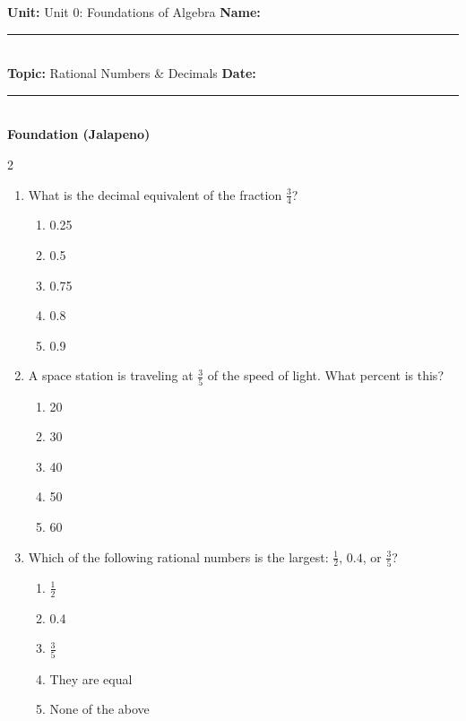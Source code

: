 \documentclass[10pt]{article}
\begin{document}
\enlargethispage{2.5cm}

\begin{tcolorbox}[colback=mainblue!5, colframe=mainblue, sharp corners, boxrule=0.5pt]
    \small \textbf{Unit:} Unit 0: Foundations of Algebra \hfill \textbf{Name:} \rule{3cm}{0.4pt} \\
    \small \textbf{Topic:} Rational Numbers & Decimals \hfill \textbf{Date:} \rule{2cm}{0.4pt} \\
    \centering \textbf{\large Foundation (Jalapeno)}
\end{tcolorbox}

\vspace{0.2cm}

\begin{multicols}{2}
\begin{enumerate}[label=\textbf{Q\arabic*.}, leftmargin=*, itemsep=6pt, parsep=0pt]

  \item \small What is the decimal equivalent of the fraction $\frac{3}{4}$?
  \begin{enumerate}[label=(\Alph*), leftmargin=0.6cm, nosep, itemsep=2pt]
    \item 0.25
    \item 0.5
    \item 0.75
    \item 0.8
    \item 0.9
  \end{enumerate}

  \item \small A space station is traveling at $\frac{3}{5}$ of the speed of light. What percent is this?
  \begin{enumerate}[label=(\Alph*), leftmargin=0.6cm, nosep, itemsep=2pt]
    \item 20%
    \item 30%
    \item 40%
    \item 50%
    \item 60%
  \end{enumerate}

  \item \small Which of the following rational numbers is the largest: $\frac{1}{2}$, $0.4$, or $\frac{3}{5}$?
  \begin{enumerate}[label=(\Alph*), leftmargin=0.6cm, nosep, itemsep=2pt]
    \item $\frac{1}{2}$
    \item 0.4
    \item $\frac{3}{5}$
    \item They are equal
    \item None of the above
  \end{enumerate}


\end{enumerate}
\end{multicols}
\end{document}
